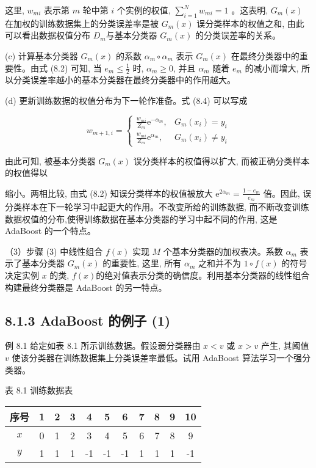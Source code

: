 \documentclass[10pt]{article}
\begin{document}
这里, $w_{m i}$ 表示第 $m$ 轮中第 $i$ 个实例的权值, $\sum_{i=1}^{N} w_{m i}=1$ 。这表明, $G_{m}(x)$ 在加权的训练数据集上的分类误差率是被 $G_{m}(x)$ 误分类样本的权值之和, 由此可以看出数据权值分布 $D_{m}$与基本分类器 $G_{m}(x)$ 的分类误差率的关系。

(c) 计算基本分类器 $G_{m}(x)$ 的系数 $\alpha_{m} \circ \alpha_{m}$ 表示 $G_{m}(x)$ 在最终分类器中的重要性。由式 (8.2) 可知, 当 $e_{m} \leqslant \frac{1}{2}$ 时, $\alpha_{m} \geqslant 0$, 并且 $\alpha_{m}$ 随着 $e_{m}$ 的减小而增大, 所以分类误差率越小的基本分类器在最终分类器中的作用越大。

(d) 更新训练数据的权值分布为下一轮作准备。式 (8.4) 可以写成

$$
w_{m+1, i}= \begin{cases}\frac{w_{m i}}{Z_{m}} \mathrm{e}^{-\alpha_{m}}, & G_{m}\left(x_{i}\right)=y_{i} \\ \frac{w_{m i}}{Z_{m}} \mathrm{e}^{\alpha_{m}}, & G_{m}\left(x_{i}\right) \neq y_{i}\end{cases}
$$

由此可知, 被基本分类器 $G_{m}(x)$ 误分类样本的权值得以扩大, 而被正确分类样本的权值得以

缩小。两相比较, 由式 (8.2) 知误分类样本的权值被放大 $\mathrm{e}^{2 \alpha_{m}}=\frac{1-e_{m}}{e_{m}}$ 倍。因此, 误分类样本在下一轮学习中起更大的作用。不改变所给的训练数据, 而不断改变训练数据权值的分布,使得训练数据在基本分类器的学习中起不同的作用, 这是 AdaBoost 的一个特点。

（3）步骤 (3) 中线性组合 $f(x)$ 实现 $M$ 个基本分类器的加权表决。系数 $\alpha_{m}$ 表示了基本分类器 $G_{m}(x)$ 的重要性, 这里, 所有 $\alpha_{m}$ 之和并不为 $1 \circ f(x)$ 的符号决定实例 $x$ 的类, $f(x)$的绝对值表示分类的确信度。利用基本分类器的线性组合构建最终分类器是 AdaBoost 的另一特点。

\subsection*{8.1.3 AdaBoost 的例子 (1)}
例 8.1 给定如表 8.1 所示训练数据。假设弱分类器由 $x<v$ 或 $x>v$ 产生, 其阈值 $v$ 使该分类器在训练数据集上分类误差率最低。试用 AdaBoost 算法学习一个强分类器。

表 8.1 训练数据表

\begin{center}
\begin{tabular}{ccccccccccc}
\hline
序号 & 1 & 2 & 3 & 4 & 5 & 6 & 7 & 8 & 9 & 10 \\
\hline
$x$ & 0 & 1 & 2 & 3 & 4 & 5 & 6 & 7 & 8 & 9 \\
$y$ & 1 & 1 & 1 & -1 & -1 & -1 & 1 & 1 & 1 & -1 \\
\hline
\end{tabular}
\end{center}
\end{document}
